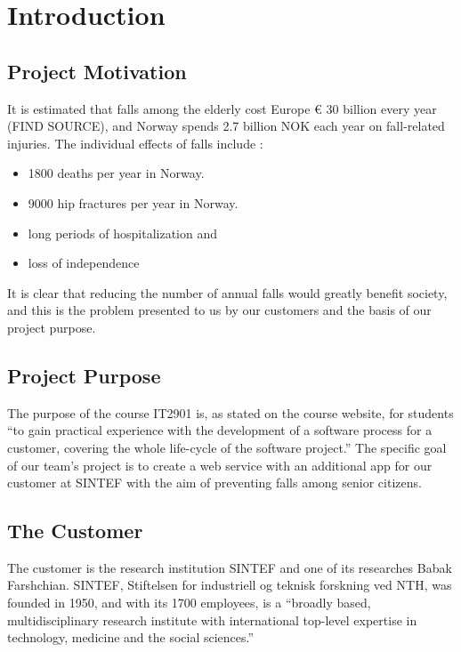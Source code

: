 

\chapter{Introduction}
\section{Project Motivation}
It is estimated that falls among the elderly cost Europe \euro{} 30 billion every year (FIND SOURCE), and Norway spends 2.7 billion NOK each year on fall-related injuries. The individual effects of falls include \citep{fallforebygging}: 
\begin{itemize}
  \item 1800 deaths per year in Norway.
  \item 9000 hip fractures per year in Norway.
  \item long periods of hospitalization and
  \item loss of independence
\end{itemize}

It is clear that reducing the number of annual falls would greatly benefit society, and this is the problem presented to us by our customers and the basis of our project purpose.

\section{Project Purpose}
The purpose of the course IT2901 is, as stated on the course website, for students “to gain practical experience with the development of a software process for a customer, covering the whole life-cycle of the software project.”\citep{course} The specific goal of our team’s project is to create a web service with an additional app for our customer at SINTEF with the aim of preventing falls among senior citizens. 

\section{The Customer}

The customer is the research institution SINTEF and one of its researches Babak Farshchian. SINTEF, Stiftelsen for industriell og teknisk forskning ved NTH, was founded in  1950, and with its 1700 employees, is a “broadly based, multidisciplinary research institute with international top-level expertise in technology, medicine and the social sciences.”\citep{sintef}

